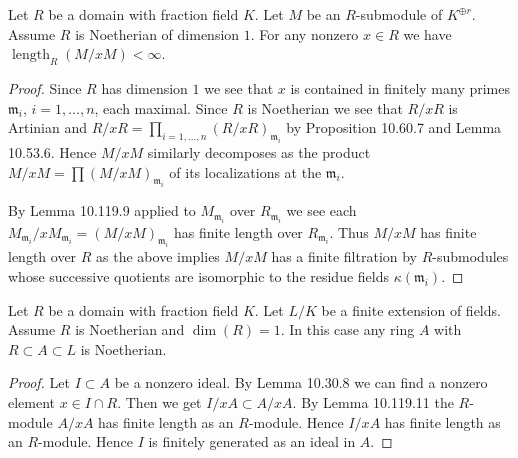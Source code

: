 \begin{lemma}[10.119.11]
Let $R$ be a domain with fraction field $K$. Let $M$ be an $R$-submodule of $K^{\oplus r}$. Assume $R$ is Noetherian of dimension $1$. For any nonzero $x\in R$ we have $\operatorname{length}_R(M/xM)<\infty$.
\end{lemma}
\begin{proof}
Since $R$ has dimension $1$ we see that $x$ is contained in finitely many primes $\mathfrak m_i$, $i=1,\ldots,n$, each maximal. Since $R$ is Noetherian we see that $R/xR$ is Artinian and $R/xR=\prod_{i=1,\ldots,n}(R/xR)_{\mathfrak m_i}$ by Proposition 10.60.7 and Lemma 10.53.6. Hence $M/xM$ similarly decomposes as the product $M/xM=\prod(M/xM)_{\mathfrak m_i}$ of its localizations at the $\mathfrak m_i$.

By Lemma 10.119.9 applied to $M_{\mathfrak m_i}$ over $R_{\mathfrak m_i}$ we see each $M_{\mathfrak m_i}/xM_{\mathfrak m_i}=(M/xM)_{\mathfrak m_i}$ has finite length over $R_{\mathfrak m_i}$. Thus $M/xM$ has finite length over $R$ as the above implies $M/xM$ has a finite filtration by $R$-submodules whose successive quotients are isomorphic to the residue fields $\kappa(\mathfrak m_i)$.
\end{proof}

\begin{lemma}
Let $R$ be a domain with fraction field $K$. Let $L/K$ be a finite extension of fields. Assume $R$ is Noetherian and $\dim(R)=1$. In this case any ring $A$ with $R\subset A\subset L$ is Noetherian.
\end{lemma}
\begin{proof}
Let $I\subset A$ be a nonzero ideal. By Lemma 10.30.8 we can find a nonzero element $x\in I\cap R$. Then we get $I/xA\subset A/xA$. By Lemma 10.119.11 the $R$-module $A/xA$ has finite length as an $R$-module. Hence $I/xA$ has finite length as an $R$-module. Hence $I$ is finitely generated as an ideal in $A$.
\end{proof}
